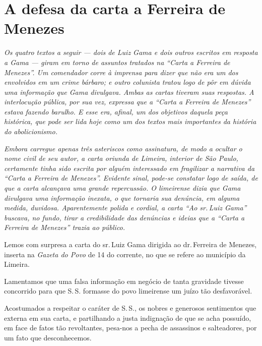 {\part{A defesa da carta a Ferreira de Menezes}

\begin{didas}
\emph{Os quatro textos a seguir --- dois de Luiz Gama e dois outros
escritos em resposta a Gama --- giram em torno de assuntos tratados na
``Carta a Ferreira de Menezes''. Um comendador corre à imprensa para
dizer que não era um dos envolvidos em um crime bárbaro; e outro
colunista tratou logo de pôr em dúvida uma informação que Gama
divulgava. Ambas as cartas tiveram suas respostas. A interlocução
pública, por sua vez, expressa que a ``Carta a Ferreira de Menezes''
estava fazendo barulho. E esse era, afinal, um dos objetivos
daquela peça histórica, que pode ser lida hoje como um dos textos mais
importantes da história do abolicionismo.}
\end{didas}


\begin{resumo}
\emph{Embora carregue apenas três asteriscos como assinatura, de modo a
ocultar o nome civil de seu autor, a carta oriunda de Limeira, interior
de São Paulo, certamente tinha sido escrita por alguém interessado em
fragilizar a narrativa da ``Carta a Ferreira de Menezes''. Evidente
sinal, pode-se constatar logo de saída, de que a carta alcançava uma
grande repercussão. O limeirense dizia que Gama divulgava uma informação
inexata, o que tornaria sua denúncia, em alguma medida, duvidosa.
Aparentemente polida e cordial, a carta ``Ao sr.\,Luiz Gama'' buscava, no
fundo, tirar a credibilidade das denúncias e ideias que a ``Carta a
Ferreira de Menezes'' trazia ao público. }
\end{resumo}

Lemos com surpresa a carta do sr.\,Luiz Gama dirigida ao dr.\,Ferreira de
Menezes, inserta na \emph{Gazeta do Povo} de 14 do corrente, no que se
refere ao município da Limeira.

Lamentamos que uma falsa informação em negócio de tanta gravidade
tivesse concorrido para que S.\,S. formasse do povo limeirense um juízo
tão desfavorável.

Acostumados a respeitar o caráter de S.\,S., os nobres e generosos
sentimentos que externa em sua carta, e partilhando a justa indignação
de que se acha possuído, em face de fatos tão revoltantes,
pesa-nos a pecha de assassinos e salteadores, por um fato que
desconhecemos.

}
